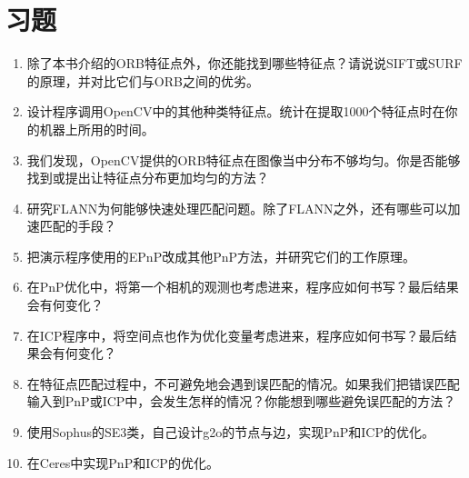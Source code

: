 \section*{习题}
\begin{enumerate}
	\item 除了本书介绍的ORB特征点外，你还能找到哪些特征点？请说说SIFT或SURF的原理，并对比它们与ORB之间的优劣。
	\item 设计程序调用OpenCV中的其他种类特征点。统计在提取1000个特征点时在你的机器上所用的时间。
	\item[\optional] 我们发现，OpenCV提供的ORB特征点在图像当中分布不够均匀。你是否能够找到或提出让特征点分布更加均匀的方法？
	\item 研究FLANN为何能够快速处理匹配问题。除了FLANN之外，还有哪些可以加速匹配的手段？
	\item 把演示程序使用的EPnP改成其他PnP方法，并研究它们的工作原理。
	\item 在PnP优化中，将第一个相机的观测也考虑进来，程序应如何书写？最后结果会有何变化？
	\item 在ICP程序中，将空间点也作为优化变量考虑进来，程序应如何书写？最后结果会有何变化？
	\item[\optional] 在特征点匹配过程中，不可避免地会遇到误匹配的情况。如果我们把错误匹配输入到PnP或ICP中，会发生怎样的情况？你能想到哪些避免误匹配的方法？
	\item[\optional] 使用Sophus的SE3类，自己设计g2o的节点与边，实现PnP和ICP的优化。
	\item[\optional] 在Ceres中实现PnP和ICP的优化。
\end{enumerate}

